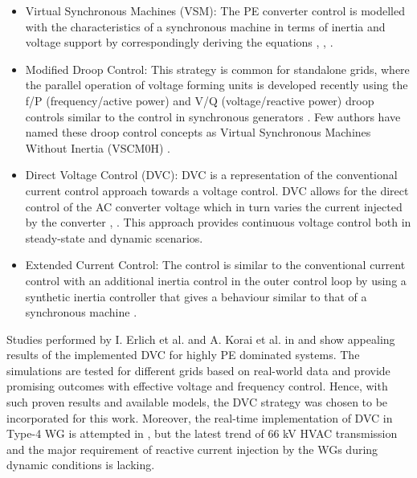 \begin{itemize}
    \item Virtual Synchronous Machines (VSM): The \gls{PE} converter control is modelled with the characteristics of a synchronous machine in terms of inertia and voltage support by correspondingly deriving the equations \cite{markovic2018lqr}, \cite{duckwitz_operating_behavior}, \cite{lu_virtual_2019}.
    
    \item Modified Droop Control:
    This strategy is common for standalone grids, where the parallel operation of voltage forming units is developed recently using the f/P (frequency/active power) and V/Q (voltage/reactive power) droop controls similar to the control in synchronous generators \cite{bouzid2016simulation}. Few authors have named these droop control concepts as Virtual Synchronous Machines Without Inertia (VSCM0H) \cite{yu2016use}.
    
    \item Direct Voltage Control (\gls{DVC}):
    \gls{DVC} is a representation of the conventional current control approach towards a voltage control. \gls{DVC} allows for the direct control of the \gls{AC} converter voltage which in turn varies the current injected by the converter  \cite{korai_dynamic_2019}, \cite{erlich_new_2017}. This approach provides continuous voltage control both in steady-state and dynamic scenarios. %
    
    \item Extended Current Control:
    The control is similar to the conventional current control with an additional inertia control in the outer control loop by using a synthetic inertia controller that gives a behaviour similar to that of a synchronous machine \cite{duckwitz_derivation_2019} \cite{liu2017control}. 
\end{itemize}

Studies performed by I. Erlich et al. and A. Korai et al. in \cite{erlich_new_2017} and \cite{korai_dynamic_2019} show appealing results of the implemented \gls{DVC} for highly \gls{PE} dominated systems. The simulations are tested for different grids based on real-world data and provide promising outcomes with effective voltage and frequency control. Hence, with such proven results and available models, the \gls{DVC} strategy was chosen to be incorporated for this work. Moreover, the real-time implementation of \gls{DVC} in Type-4 \gls{WG} is attempted in \cite{sethi_real-time_nodate-new}, but the latest trend of 66 kV \gls{HVAC} transmission and the major requirement of reactive current injection by the \gls{WG}s during dynamic conditions is lacking.

